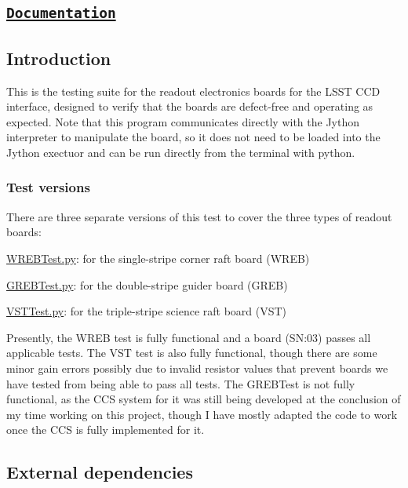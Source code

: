 \subsection*{\href{https://bencbartlett.github.io/SLAC/}{\tt Documentation}}

\subsection*{Introduction}

This is the testing suite for the readout electronics boards for the L\+S\+ST C\+CD interface, designed to verify that the boards are defect-\/free and operating as expected. Note that this program communicates directly with the Jython interpreter to manipulate the board, so it does not need to be loaded into the Jython exectuor and can be run directly from the terminal with python.

\subsubsection*{Test versions}

There are three separate versions of this test to cover the three types of readout boards\+:
\begin{DoxyEnumerate}
\item \hyperlink{_w_r_e_b_test_8py}{W\+R\+E\+B\+Test.\+py}\+: for the single-\/stripe corner raft board (W\+R\+EB)
\item \hyperlink{_g_r_e_b_test_8py}{G\+R\+E\+B\+Test.\+py}\+: for the double-\/stripe guider board (G\+R\+EB)
\item \hyperlink{_v_s_t_test_8py}{V\+S\+T\+Test.\+py}\+: for the triple-\/stripe science raft board (V\+ST)
\end{DoxyEnumerate}

Presently, the W\+R\+EB test is fully functional and a board (SN\+:03) passes all applicable tests. The V\+ST test is also fully functional, though there are some minor gain errors possibly due to invalid resistor values that prevent boards we have tested from being able to pass all tests. The G\+R\+E\+B\+Test is not fully functional, as the C\+CS system for it was still being developed at the conclusion of my time working on this project, though I have mostly adapted the code to work once the C\+CS is fully implemented for it.

\subsection*{External dependencies}

